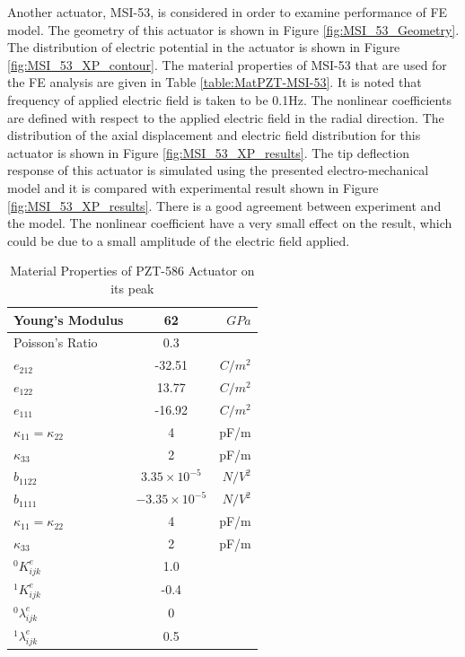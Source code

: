 Another actuator, MSI-53, is considered in order to examine performance of FE model. 
The geometry of this actuator is shown in Figure \ref{fig:MSI_53_Geometry}. 
The distribution of electric potential in the actuator is shown in Figure \ref{fig:MSI_53_XP_contour}. 
The material properties of MSI-53 that are used for the FE analysis are given in Table \ref{table:MatPZT-MSI-53}. 
It is noted that frequency of applied electric field is taken to be 0.1Hz. 
The nonlinear coefficients are defined with respect to the applied electric field in the radial direction.
The distribution of the axial displacement and electric field distribution for this actuator is shown in Figure \ref{fig:MSI_53_XP_results}. 
The tip deflection response of this actuator is simulated using the presented electro-mechanical model and it is compared with experimental result shown in Figure \ref{fig:MSI_53_XP_results}. 
There is a good agreement between experiment and the model. 
The nonlinear coefficient have a very small effect on the result, which could be due to a small amplitude of the electric field applied.

\newpage 
 
\begin{table}
\caption{Material Properties of PZT-586 Actuator on its peak\cite{Alexander}}
\centering
\begin{tabular}{|l|c|r|}
\hline 
Young's Modulus&62& $GPa$\\ \hline
Poisson's Ratio&0.3& \\ \hline 
$e_{212}$ &-32.51&$C/m^2$\\ \hline
$e_{122}$ &13.77&$C/m^2$\\ \hline
$e_{111}$ & -16.92&$C/m^2$\\ \hline
$\kappa_{11}=\kappa_{22}$ & 4 &pF/m\\ \hline
$\kappa_{33}$ & 2 &pF/m\\ \hline
$\widehat{b}_{1122}$ & $3.35 \times 10^{-5}$ &  $ N/V^2 $\\ \hline
$\widehat{b}_{1111} $ & $-3.35 \times 10^{-5}$ &$ N/V^2 $\\ \hline
$\kappa_{11}=\kappa_{22}$ & 4 &pF/m\\ \hline
$\kappa_{33}$ & 2 &pF/m\\ \hline
${}^{0}K_{ijk}^{e}$&1.0&\\ \hline
${}^{1}K_{ijk}^{e}$&-0.4&\\ \hline
${}^{0}\lambda_{ijk}^{e}$&0&\\ \hline
${}^{1}\lambda_{ijk}^{e}$&0.5&\\ \hline 
\end{tabular}
\label{table:MatPZT-PZT-586}
\end{table}

